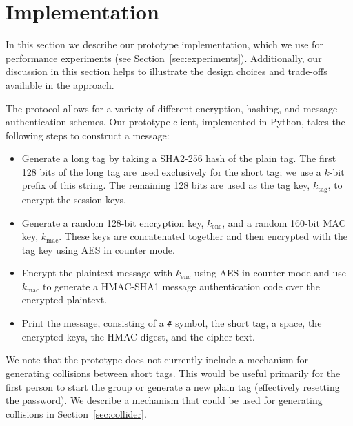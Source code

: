 \section{Implementation}
\label{sec:implementation}

In this section we describe our prototype \hoot implementation, which we
use for performance experiments (see
Section~\ref{sec:experiments}). Additionally, our discussion in this
section helps to illustrate the design choices and trade-offs available
in the \hoot approach.

The \hoot protocol allows for a variety of different encryption,
hashing, and message authentication schemes. Our prototype client,
implemented in Python, takes the following steps to construct a message:
\begin{itemize}
\item Generate a long tag by taking a SHA2-256 hash of the plain
  tag. The first 128 bits of the long tag are used exclusively for the
  short tag; we use a $k$-bit prefix of this string. The remaining 128
  bits are used as the tag key, $k_{\mathrm{tag}}$, to encrypt the
  session keys.
\item Generate a random 128-bit encryption key, $k_{\mathrm{enc}}$,
   and a random 160-bit MAC key,
  $k_{\mathrm{mac}}$. These keys are
  concatenated together and then encrypted with the tag key using AES in
  counter mode.
\item Encrypt the plaintext message with $k_{\mathrm{enc}}$ using AES in
  counter mode and use $k_{\mathrm{mac}}$ to generate a HMAC-SHA1
  message authentication code over the encrypted plaintext.
\item Print the message, consisting of a {\tt \#} symbol, the short tag,
  a space, the encrypted keys, the HMAC digest, and the cipher text.
\end{itemize}

We note that the prototype does not currently include a mechanism for
generating collisions between short tags. This would be useful primarily
for the first person to start the group or generate a new plain tag
(effectively resetting the password). We describe a mechanism that
could be used for generating collisions in Section~\ref{sec:collider}.

